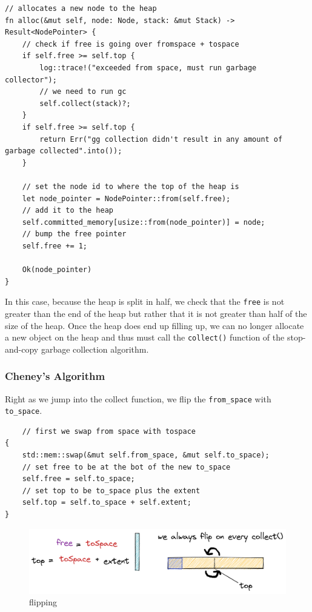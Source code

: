 \documentclass[index]{subfiles}
\begin{document}
\begin{verbatim}
// allocates a new node to the heap
fn alloc(&mut self, node: Node, stack: &mut Stack) -> Result<NodePointer> {
    // check if free is going over fromspace + tospace
    if self.free >= self.top {
        log::trace!("exceeded from space, must run garbage collector");
        // we need to run gc
        self.collect(stack)?;
    }
    if self.free >= self.top {
        return Err("gg collection didn't result in any amount of garbage collected".into());
    }

    // set the node id to where the top of the heap is
    let node_pointer = NodePointer::from(self.free);
    // add it to the heap
    self.committed_memory[usize::from(node_pointer)] = node;
    // bump the free pointer
    self.free += 1;

    Ok(node_pointer)
}
\end{verbatim}

In this case, because the heap is split in half, we check that the \verb+free+ is not greater than the end of the heap but rather that it is not greater than half of the size of the heap. Once the heap does end up filling up, we can no longer allocate a new object on the heap and thus must call the \verb+collect()+ function of the stop-and-copy garbage collection algorithm.

\subsubsection{Cheney's Algorithm}

Right as we jump into the collect function, we flip the \verb+from_space+ with \verb+to_space+.

\begin{verbatim}
    // first we swap from space with tospace
{
    std::mem::swap(&mut self.from_space, &mut self.to_space);
    // set free to be at the bot of the new to_space
    self.free = self.to_space;
    // set top to be to_space plus the extent
    self.top = self.to_space + self.extent;
}
\end{verbatim}

\begin{figure}[H]
    \centering
    \includegraphics[scale=0.25]{pics/flipping.png}
    \caption{flipping}
\end{figure}
\end{document}
